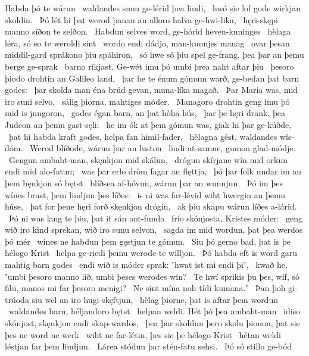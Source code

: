 Habda þó te wárun \hld\ waldandes sunu
ge-lérid þea liudi, \hld\ hwó sie lof gode
wirkjan skoldin. \hld\ Þó lét hi þat werod þanan
an alloro halva ge-hwi-lika, \hld\ hęri-skępi manno
síðon te selðon. \hld\ Habdun selves word,
ge-hórid heven-kuninges \hld\ hèlaga léra,
só eo te weroldi sint \hld\ wordo endi dádjo,
man-kunnjes manag \hld\ ovar þesan middil-gard
sprákono þiu spáhiron, \hld\ só hwe só þiu spel ge-frang,
þea þar an þemu berge ge-sprak \hld\ barno ríkjast.
Ge-wét imu þó umbi þrea naht aftar þiu \hld\ þesoro þiodo drohtin
an Galileo land, \hld\ þar he te énum gómum warð,
ge-bedan þat barn godes: \hld\ þar skolda man éna brúd gevan,
muna-líka magað. \hld\ Þar Maria was,
mid iro suni selvo, \hld\ sálig þiorna,
mahtiges móder. \hld\ Managoro drohtin
geng imu þó mid is jungoron, \hld\ godes égan barn,
an þat hòha hús, \hld\ þar þe hęri drank,
þea Judeon an þemu gast-sęli: \hld\ he im ók at þem gómun was,
giak hi þar ge-kúðde, \hld\ þat hi habda kraft godes,
helpa fan himil-fader, \hld\ hèlagna gést,
waldandes wís-dóm. \hld\ Werod blíðode,
wárun þar an luston \hld\ liudi at-samne,
gumon glad-módje. \hld\ Gengun ambaht-man,
skęnkjon mid skálun, \hld\ drógun skírjane wín
mid orkun endi mid alo-fatun; \hld\ was þar erlo dròm
fagar an flęttja, \hld\ þó þar folk undar im
an þem bęnkjon só bętst \hld\ blíðsea af-hóvun,
wárun þar an wunnjun. \hld\ Þó im þes wínes brast,
þem liudjun þes líðes: \hld\ is ni was far-lévid wiht
hwergin an þemu húse, \hld\ þat for þene hęri forð
skęnkjon drógin, \hld\ ak þiu skapu wárun
líðes a-lárid. \hld\ Þó ni was lang te þiu,
þat it sán ant-funda \hld\ frío skónjosta,
Kristes móder: \hld\ geng wið iro kind sprekan,
wið iro sunu selvon, \hld\ sagda im mid wordun,
þat þea werdos þó mér \hld\ wínes ne habdun
þem gęstjun te gómun. \hld\ Siu þó gerno bad,
þat is þe hélogo Krist \hld\ helpa ge-riedi
þemu werode te willjon. \hld\ Þó habda eft is word garu
mahtig barn godes \hld\ endi wið is móder sprak:
ʽhwat ist mi endi þiʼ, \hld\ kwað he, ʽumbi þesoro manno lið,
umbi þeses werodes wín? \hld\ Te hwí sprikis þu þes, wíf, só filu,
manos mi far þesoro menigi? \hld\ Ne sint mína noh
tídi kumana.ʼ \hld\ Þan þoh gi-trúoda siu wel
an iro hugi-skęftjun, \hld\ hèlag þiorne,
þat is aftar þem wordun \hld\ waldandes barn,
héljandoro bętst \hld\ helpan weldi.
Hét þó þea ambaht-man \hld\ idiso skónjost,
skęnkjon endi skap-wardos, \hld\ þea þar skoldun þero skolu þionon,
þat sie þes ne word ne werk \hld\ wiht ne far-létin,
þes sie þe hélogo Krist \hld\ hétan weldi
léstjan far þem liudjun. \hld\ Lárea stódun þar
stén-fatu sehsi. \hld\ Þó só stillo ge-bód
